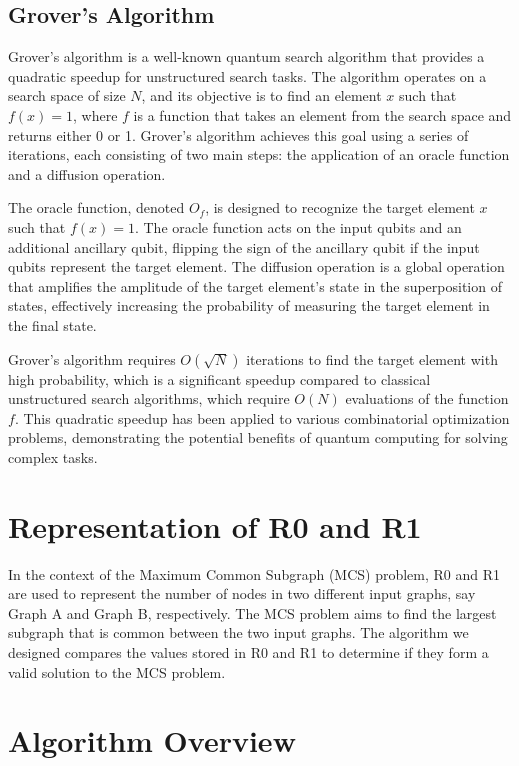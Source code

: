 \subsection{Grover's Algorithm}

Grover's algorithm is a well-known quantum search algorithm that provides a quadratic speedup for unstructured search tasks. The algorithm operates on a search space of size $N$, and its objective is to find an element $x$ such that $f(x)=1$, where $f$ is a function that takes an element from the search space and returns either 0 or 1. Grover's algorithm achieves this goal using a series of iterations, each consisting of two main steps: the application of an oracle function and a diffusion operation.

The oracle function, denoted $O_f$, is designed to recognize the target element $x$ such that $f(x)=1$. The oracle function acts on the input qubits and an additional ancillary qubit, flipping the sign of the ancillary qubit if the input qubits represent the target element. The diffusion operation is a global operation that amplifies the amplitude of the target element's state in the superposition of states, effectively increasing the probability of measuring the target element in the final state.

Grover's algorithm requires $O(\sqrt{N})$ iterations to find the target element with high probability, which is a significant speedup compared to classical unstructured search algorithms, which require $O(N)$ evaluations of the function $f$. This quadratic speedup has been applied to various combinatorial optimization problems, demonstrating the potential benefits of quantum computing for solving complex tasks.



\section{Representation of R0 and R1}

In the context of the Maximum Common Subgraph (MCS) problem, R0 and R1 are used to represent the number of nodes in two different input graphs, say Graph A and Graph B, respectively. The MCS problem aims to find the largest subgraph that is common between the two input graphs. The algorithm we designed compares the values stored in R0 and R1 to determine if they form a valid solution to the MCS problem.

\section{Algorithm Overview}


